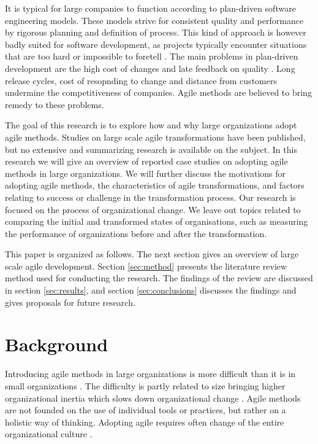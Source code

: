 \documentclass[lnbip]{svmultln}
\begin{document}
It is typical for large companies to function according to plan-driven software
engineering models. These models strive for consistent quality and performance
by rigorous planning and definition of process. This kind of approach is however
badly suited for software development, as projects typically encounter
situations that are too hard or impossible to foretell .
The main problems in plan-driven development are the high cost of changes and
late feedback on quality . Long release cycles, cost of
resopnding to change and distance from customers undermine the  competitiveness
of companies. Agile methods are believed to bring remedy to these problems.

The goal of this research is to explore how and why large organizations adopt
agile methods. Studies on large scale agile transformations have been published,
but no extensive and summarizing research is available on the subject. In this
research we will give an overview of reported case studies on adopting agile
methods in large organizations. We will further discuss the motivations for
adopting agile methods, the characteristics of agile transformations, and
factors relating to success or challenge in the transformation process. Our
research is focused on the process of organizational change. We leave out topics
related to comparing the initial and transformed states of organisations, such
as measuring the performance of organizations before and after the
transformation.

This paper is organized as follows. The next section gives an overview of large
scale agile development. Section \ref{sec:method} presents the literature review
method used for conducting the research. The findings of the review are
discussed in section \ref{sec:results}, and section \ref{sec:conclusions}
discusses the findings and gives proposals for future research.


\section{Background}
\label{sec:background}

Introducing agile methods in large organizations is more difficult than it is in
small organizations . The difficulty is partly related to size
bringing higher organizational inertia which slows down organizational change
. Agile methods are not founded on the use of individual
tools or practices, but rather on a holistic way of thinking.
Adopting agile requires often change of the entire organizational culture
.
\end{document}
